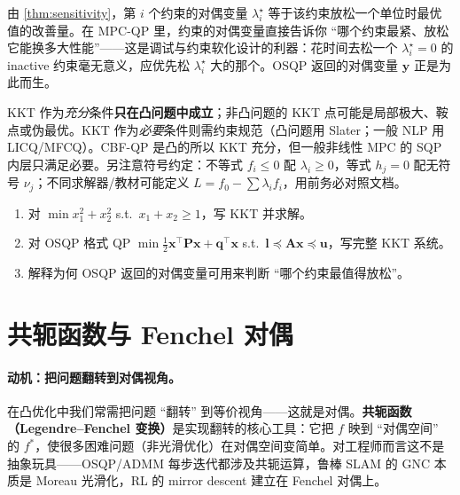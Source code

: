 \begin{insight}\label{ins:shadow-price}
由 \cref{thm:sensitivity}，第 $i$ 个约束的对偶变量 $\lambda_i^\star$ 等于该约束放松一个单位时最优值的改善量。在 MPC-QP 里，约束的对偶变量直接告诉你 “哪个约束最紧、放松它能换多大性能”——这是调试与约束软化设计的利器：花时间去松一个 $\lambda_i^\star=0$ 的 inactive 约束毫无意义，应优先松 $\lambda_i^\star$ 大的那个。OSQP 返回的对偶变量 $\mathbf y$ 正是为此而生。
\end{insight}

\begin{pitfall}
KKT 作为\emph{充分}条件\textbf{只在凸问题中成立}；非凸问题的 KKT 点可能是局部极大、鞍点或伪最优。KKT 作为\emph{必要}条件则需约束规范（凸问题用 Slater；一般 NLP 用 LICQ/MFCQ）。CBF-QP 是凸的所以 KKT 充分，但一般非线性 MPC 的 SQP 内层只满足必要。另注意符号约定：不等式 $f_i\le0$ 配 $\lambda_i\ge0$，等式 $h_j=0$ 配无符号 $\nu_j$；不同求解器/教材可能定义 $L=f_0-\sum\lambda_i f_i$，用前务必对照文档。
\end{pitfall}

\begin{practice}
\begin{enumerate}
  \item 对 $\min x_1^2+x_2^2$ s.t.\ $x_1+x_2\ge1$，写 KKT 并求解。
  \item 对 OSQP 格式 QP $\min\tfrac12\mathbf x^\top\mathbf P\mathbf x+\mathbf q^\top\mathbf x$ s.t.\ $\mathbf l\preceq\mathbf A\mathbf x\preceq\mathbf u$，写完整 KKT 系统。
  \item 解释为何 OSQP 返回的对偶变量可用来判断 “哪个约束最值得放松”。
\end{enumerate}
\end{practice}

\section{共轭函数与 Fenchel 对偶}
\label{sec:cvx-conjugate}

\paragraph{动机：把问题翻转到对偶视角。}
在凸优化中我们常需把问题 “翻转” 到等价视角——这就是对偶。\textbf{共轭函数（Legendre--Fenchel 变换）}是实现翻转的核心工具：它把 $f$ 映到 “对偶空间” 的 $f^\ast$，使很多困难问题（非光滑优化）在对偶空间变简单。对工程师而言这不是抽象玩具——OSQP/ADMM 每步迭代都涉及共轭运算，鲁棒 SLAM 的 GNC 本质是 Moreau 光滑化，RL 的 mirror descent 建立在 Fenchel 对偶上。

